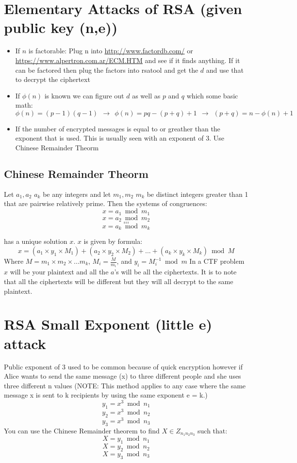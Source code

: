 \documentclass{report}
\begin{document}
\section{Elementary Attacks of RSA (given public key (n,e))}
\begin{itemize}
\item If $n$ is factorable: Plug n into \url{http://www.factordb.com/} or \url{https://www.alpertron.com.ar/ECM.HTM} and see if it finds anything.  If it can be factored then plug the factors into rsatool and get the $d$ and use that to decrypt the ciphertext
\item If $\phi(n)$ is known we can figure out $d$ as well as $p$ and $q$ which some basic math:   
		\[\phi(n) = (p - 1)(q - 1) \ \  \rightarrow \ \ \phi(n) = pq - (p + q) +  1 \ \ \rightarrow \ \  (p + q) = n - \phi(n) + 1\]
\item If the number of encrypted messages is equal to or greather than the exponent that is used.  This is usually seen with an exponent of 3. Use Chinese Remainder Theorm
\end{itemize}

\subsection{Chinese Remainder Theorm}
Let $a_1, a_2$ \textellipsis $a_k$ be any integers and let $m_1, m_2$ \textellipsis $m_k$ be distinct integers greater than 1 that are pairwise relatively prime. Then the systems of congruences:
\[x = a_1 \bmod m_1\]
\[x = a_2 \bmod m_2\]
\[...\]
\[...\]
\[x = a_k \bmod m_k\]

has a unique solution $x$. $x$ is given by formula:
\[x = (a_1 \times y_1\times M_1) + (a_2\times y_2\times M_2) + ... + (a_k\times y_k\times M_k) \bmod M\]
Where $M = m_1\times m_2\times ...m_k$,     $M_i= \frac{M}{m_i}$, and $y_i = M_i^{-1} \bmod m$
\newline In a CTF problem $x$ will be your plaintext and all the $a$'s will be all the ciphertexts.  It is to note that all the ciphertexts will be different but they will all decrypt to the same plaintext.

\section{RSA Small Exponent (little e) attack}
Public exponent of 3 used to be common because of quick encryption however if Alice wants to send the same message (x) to three different people and she uses three different n values (NOTE: This method applies to any case where the same message x is sent to k recipients by using the same exponent e = k.)
\[y_1=x^3 \bmod n_1\]
					\[y_2=x^3 \bmod n_2\]
					\[y_3=x^3 \bmod n_3\]
You can use the Chinese Remainder theorem to find $X \in Z_{n_1n_2n_3}$ such that:
					\[X=y_1 \bmod n_1\]
					\[X=y_2 \bmod n_2\]
					\[X=y_3 \bmod n_3\]
\end{document}
